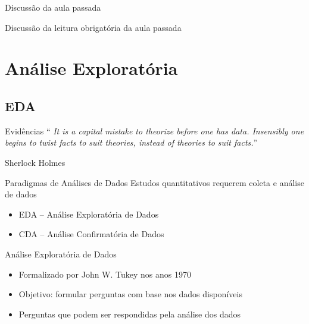 \documentclass{beamer}
\begin{document}

\begin{frame}{Discussão da aula passada}
  \begin{block}{}
    Discussão da leitura obrigatória da aula passada
  \end{block}
\end{frame}

\section{Análise Exploratória}

\subsection{EDA}

\begin{frame}
  \begin{block}{Evidências}
    \footnotesize
    ``{\em
      It is a capital mistake to theorize before one has data.
      Insensibly one begins to twist facts to suit theories, instead
      of theories to suit facts.}''

  \bigskip
  \hfill \tiny Sherlock Holmes
  \end{block}
\end{frame}

\begin{frame}{Paradigmas de Análises de Dados}
  \footnotesize
  Estudos quantitativos requerem coleta e análise de dados
  \bigskip
  \bigskip
  \begin{itemize}
  \item \alert<2>{EDA -- Análise Exploratória de Dados}
  \bigskip
  \item CDA -- Análise Confirmatória de Dados
  \end{itemize}
\end{frame}

\begin{frame}{Análise Exploratória de Dados}
  \begin{itemize}
    \footnotesize
  \item<1-> Formalizado por John W. Tukey nos anos 1970
  \bigskip
  \item<1-> Objetivo: formular perguntas com base nos dados disponíveis
  \bigskip
  \item<2-> Perguntas que podem ser respondidas pela análise dos dados
  \end{itemize}
\end{frame}
\end{document}
